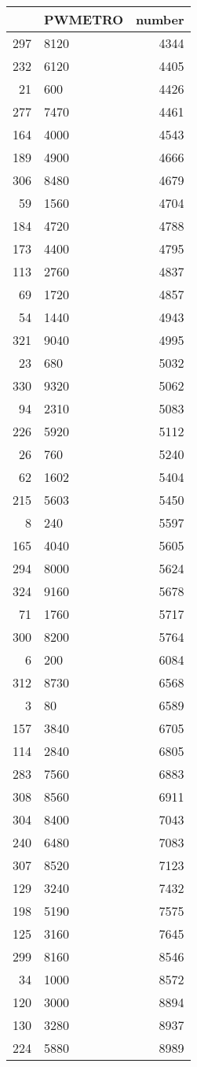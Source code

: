\begin{table}[ht]
\centering
\begin{tabular}{rlr}
  \hline
 & PWMETRO & number \\ 
  \hline
297 & 8120 & 4344 \\ 
  232 & 6120 & 4405 \\ 
  21 & 600 & 4426 \\ 
  277 & 7470 & 4461 \\ 
  164 & 4000 & 4543 \\ 
  189 & 4900 & 4666 \\ 
  306 & 8480 & 4679 \\ 
  59 & 1560 & 4704 \\ 
  184 & 4720 & 4788 \\ 
  173 & 4400 & 4795 \\ 
  113 & 2760 & 4837 \\ 
  69 & 1720 & 4857 \\ 
  54 & 1440 & 4943 \\ 
  321 & 9040 & 4995 \\ 
  23 & 680 & 5032 \\ 
  330 & 9320 & 5062 \\ 
  94 & 2310 & 5083 \\ 
  226 & 5920 & 5112 \\ 
  26 & 760 & 5240 \\ 
  62 & 1602 & 5404 \\ 
  215 & 5603 & 5450 \\ 
  8 & 240 & 5597 \\ 
  165 & 4040 & 5605 \\ 
  294 & 8000 & 5624 \\ 
  324 & 9160 & 5678 \\ 
  71 & 1760 & 5717 \\ 
  300 & 8200 & 5764 \\ 
  6 & 200 & 6084 \\ 
  312 & 8730 & 6568 \\ 
  3 & 80 & 6589 \\ 
  157 & 3840 & 6705 \\ 
  114 & 2840 & 6805 \\ 
  283 & 7560 & 6883 \\ 
  308 & 8560 & 6911 \\ 
  304 & 8400 & 7043 \\ 
  240 & 6480 & 7083 \\ 
  307 & 8520 & 7123 \\ 
  129 & 3240 & 7432 \\ 
  198 & 5190 & 7575 \\ 
  125 & 3160 & 7645 \\ 
  299 & 8160 & 8546 \\ 
  34 & 1000 & 8572 \\ 
  120 & 3000 & 8894 \\ 
  130 & 3280 & 8937 \\ 
  224 & 5880 & 8989 \\ 
   \hline
\end{tabular}
\end{table}
